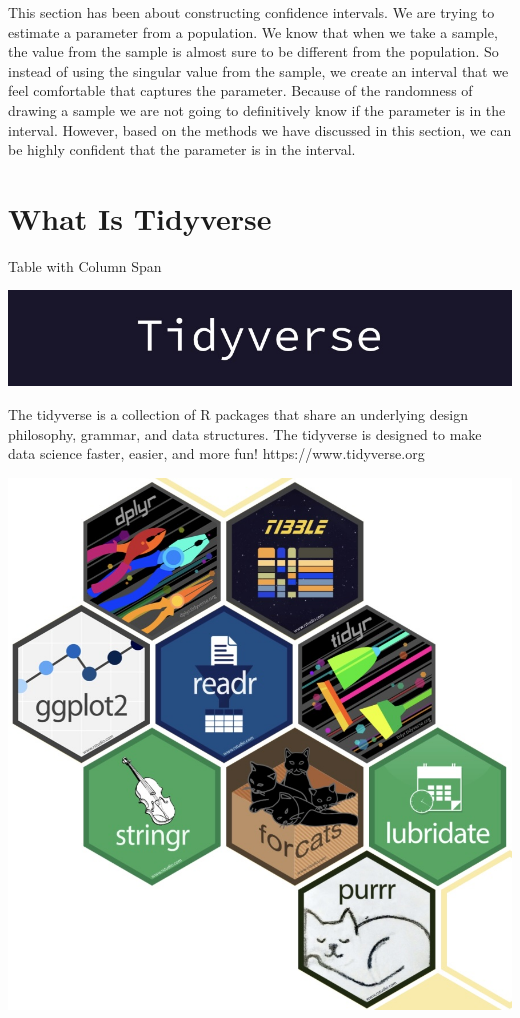 \documentclass[
  letterpaper,
  DIV=11,
  numbers=noendperiod]{scrreprt}
\begin{document}
This section has been about constructing confidence intervals. We are
trying to estimate a parameter from a population. We know that when we
take a sample, the value from the sample is almost sure to be different
from the population. So instead of using the singular value from the
sample, we create an interval that we feel comfortable that captures the
parameter. Because of the randomness of drawing a sample we are not
going to definitively know if the parameter is in the interval. However,
based on the methods we have discussed in this section, we can be highly
confident that the parameter is in the interval.


\chapter*{What Is Tidyverse}\label{what-is-tidyverse}


Table with Column Span

\includegraphics[width=1\textwidth,height=\textheight]{./images/WIT_2.jpg}

The tidyverse is a collection of R packages that share an underlying
design philosophy, grammar, and data structures. The tidyverse is
designed to make data science faster, easier, and more fun!
https://www.tidyverse.org

\includegraphics[width=1\textwidth,height=\textheight]{./images/WIT_1.jpg}
\end{document}
